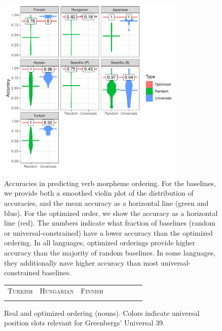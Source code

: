 \documentclass[man]{apa7}
\begin{document}
\begin{figure}[]
    \centering
\includegraphics[width=0.8\textwidth]{figures/accuracies_verbs.pdf}
    \caption{Accuracies in predicting verb morpheme ordering.
    For the baselines, we provide both a smoothed violin plot of the distribution of accuracies, and the mean accuracy as a horizontal line (green and blue). For the optimized order, we show the accuracy as a horizontal line (red).
	The numbers indicate what fraction of baselines (random or universal-constrained) have a lower accuracy than the optimized ordering.
	In all languages, optimized orderings provide higher accuracy than the majority of random baselines. In some languages, they additionally nave higher accuracy than most universal-constrained baselines.}
    \label{tab:optimized_acc_verbs}
\end{figure}


\begin{figure}[]
\begin{tabular}{cccccccc}
\textsc{Turkish} & \textsc{Hungarian} & \textsc{Finnish} \\
\begin{minipage}{.3\textwidth}
  
    \end{minipage}
  &
  \begin{minipage}{.3\textwidth}
  
    \end{minipage}
  &
  \begin{minipage}{.3\textwidth}
  
  \end{minipage}
  \end{tabular}
  
    \caption{Real and optimized ordering (nouns). Colors indicate universal position slots relevant for Greenbergs' Universal 39.}
    \label{fig:real_and_optimized_nouns}
\end{figure}
\end{document}
